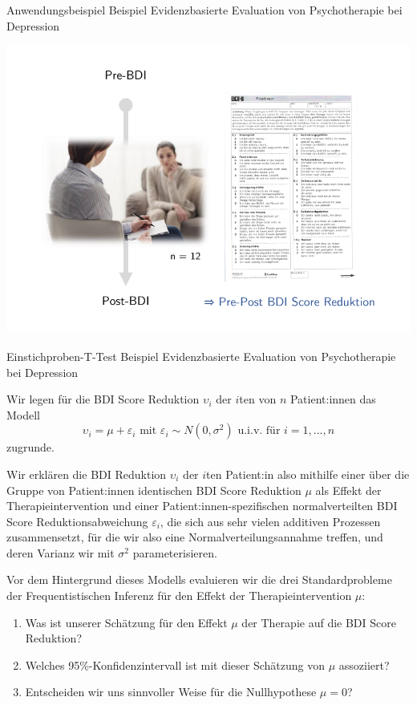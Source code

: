 \documentclass[
  8pt,
  ignorenonframetext,
]{beamer}
\providecommand{\tightlist}{%
  \setlength{\itemsep}{0pt}\setlength{\parskip}{0pt}}
\newcommand{\ups} {\upsilon}
\begin{document}
\begin{frame}{Anwendungsbeispiel}
\protect\hypertarget{anwendungsbeispiel}{}
Beispiel \textbar{} Evidenzbasierte Evaluation von Psychotherapie bei
Depression

\begin{center}\includegraphics[width=0.8\linewidth]{12_Abbildungen/wtfi_12_messplan} \end{center}
\end{frame}

\begin{frame}{Einstichproben-T-Test}
\protect\hypertarget{einstichproben-t-test-5}{}
Beispiel \textbar{} Evidenzbasierte Evaluation von Psychotherapie bei
Depression \vspace{2mm}

\small

Wir legen für die BDI Score Reduktion \(\ups_i\) der \(i\)ten von \(n\)
Patient:innen das Modell \begin{equation}
\ups_{i} = \mu + \varepsilon_{i} \mbox{ mit } \varepsilon_{i} \sim N(0,\sigma^2) \mbox{ u.i.v. für } i = 1,...,n
\end{equation} zugrunde.

Wir erklären die BDI Reduktion \(\ups_i\) der \(i\)ten Patient:in also
mithilfe einer über die Gruppe von Patient:innen identischen BDI Score
Reduktion \(\mu\) als Effekt der Therapieintervention und einer
Patient:innen-spezifischen normalverteilten BDI Score
Reduktionsabweichung \(\varepsilon_{i}\), die sich aus sehr vielen
additiven Prozessen zusammensetzt, für die wir also eine
Normalverteilungsannahme treffen, und deren Varianz wir mit \(\sigma^2\)
parameterisieren.

Vor dem Hintergrund dieses Modells evaluieren wir die drei
Standardprobleme der Frequentistischen Inferenz für den Effekt der
Therapieintervention \(\mu\):

\begin{enumerate}
[(1)]
\tightlist
\item
  Was ist unserer Schätzung für den Effekt \(\mu\) der Therapie auf die
  BDI Score Reduktion?
\item
  Welches 95\%-Konfidenzintervall ist mit dieser Schätzung von \(\mu\)
  assoziiert?
\item
  Entscheiden wir uns sinnvoller Weise für die Nullhypothese
  \(\mu = 0\)?
\end{enumerate}
\end{frame}
\end{document}
